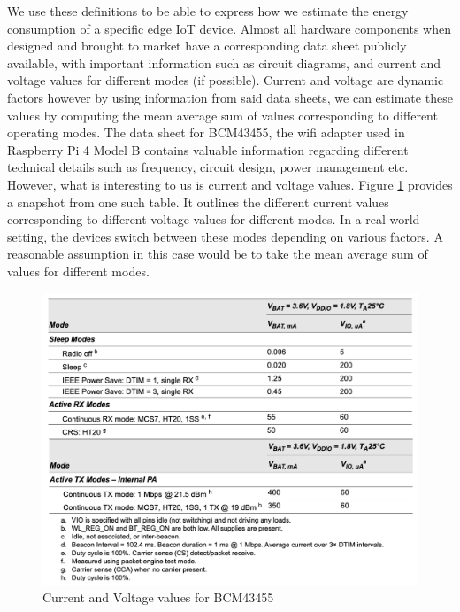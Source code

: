 We use these definitions to be able to express how we estimate the energy consumption of a specific edge IoT device. 
Almost all hardware components when designed and brought to market have a corresponding data sheet publicly available, 
with important information such as circuit diagrams, and current and voltage values for different modes (if possible). Current 
and voltage are dynamic factors however by using information from said data sheets, we can estimate these values by 
computing the mean average sum of values corresponding to different operating modes. The data sheet for BCM43455, the 
wifi adapter used in Raspberry Pi 4 Model B \cite{cypress} contains valuable information regarding different technical 
details such as frequency, circuit design, power management etc. However, 
what is interesting to us is current and voltage values. Figure \ref{fig:bcm} provides a snapshot from one such table. 
It outlines the different current values corresponding to different voltage values for different modes. In a 
real world setting, the devices switch between these modes depending on various factors. A reasonable assumption 
in this case would be to take the mean average sum of values for different modes. \\

\begin{figure}
    \begin{center}
        \includegraphics[scale=0.25]{Figs/datasheet.png}    
    \end{center}
    \caption{Current and Voltage values for BCM43455}
    \label{fig:bcm}
\end{figure}

